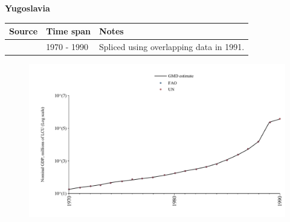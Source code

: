 \documentclass[12pt,a4paper,landscape]{article}
\begin{document}
\begin{adjustbox}{max totalsize={\paperwidth}{\paperheight},center}
\begin{minipage}[t][\textheight][t]{\textwidth}
\vspace*{0.5cm}
{}
\begin{center}
{\Large\bfseries Yugoslavia}
\end{center}
\vspace{0.5cm}
\begin{table}[H]
\centering
\small
\begin{tabular}{|l|l|l|}
\hline
\textbf{Source} & \textbf{Time span} & \textbf{Notes} \\
\hline
\rowcolor{white}\cite{UN}& 1970 - 1990 &Spliced using overlapping data in 1991.\\
\hline
\end{tabular}
\end{table}
\begin{figure}[H]
\centering
\includegraphics[width=\textwidth,height=0.6\textheight,keepaspectratio]{graphs/YUG_nGDP.pdf}
\end{figure}
\end{minipage}
\end{adjustbox}
\end{document}
